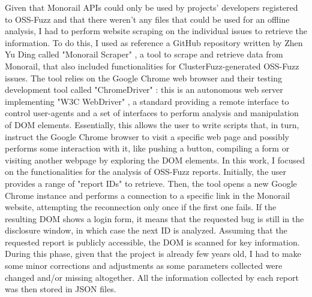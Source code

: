 \newpage
Given that Monorail APIs could only be used by projects' developers registered to OSS-Fuzz and that there weren't any files that could be used for an offline analysis, I had to perform website scraping on the individual issues to retrieve the information. 
\newline
To do this, I used as reference a GitHub repository written by Zhen Yu Ding called "Monorail Scraper" \cite{scraper}, a tool to scrape and retrieve data from Monorail, that also included functionalities for ClusterFuzz-generated OSS-Fuzz issues.
\newline \newline
The tool relies on the Google Chrome web browser and their testing development tool called "ChromeDriver" \cite{driver}: this is an autonomous web server implementing "W3C WebDriver" \cite{driver_standard}, a standard providing a remote interface to control user-agents and a set of interfaces to perform analysis and manipulation of DOM elements.
\newline
Essentially, this allows the user to write scripts that, in turn, instruct the Google Chrome browser to visit a specific web page and possibly performs some interaction with it, like pushing a button, compiling a form or visiting another webpage by exploring the DOM elements.  
\newline \newline
In this work, I focused on the functionalities for the analysis of OSS-Fuzz reports.
\newline
Initially, the user provides a range of "report IDs" to retrieve.
\newline
Then, the tool opens a new Google Chrome instance and performs a connection to a specific link in the Monorail website, attempting the reconnection only once if the first one fails. If the resulting DOM shows a login form, it means that the requested bug is still in the disclosure window, in which case the next ID is analyzed.
\newline
Assuming that the requested report is publicly accessible, the DOM is scanned for key information.
During this phase, given that the project is already few years old, I had to make some minor corrections and adjustments as some parameters collected were changed and/or missing altogether.
\newline
All the information collected by each report was then stored in JSON files.
\newline
